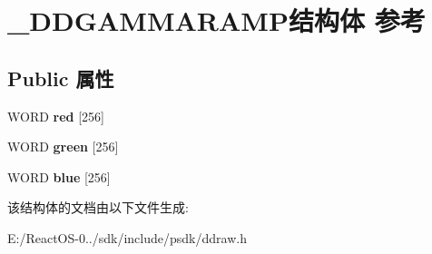\hypertarget{struct___d_d_g_a_m_m_a_r_a_m_p}{}\section{\+\_\+\+D\+D\+G\+A\+M\+M\+A\+R\+A\+M\+P结构体 参考}
\label{struct___d_d_g_a_m_m_a_r_a_m_p}
\subsection*{Public 属性}
\begin{DoxyCompactItemize}
\item 
\mbox{\label{struct___d_d_g_a_m_m_a_r_a_m_p_a33bc12ad9bbd9c04430d00385ddef9e5}} 
W\+O\+RD {\bfseries red} \mbox{[}256\mbox{]}
\item 
\mbox{\label{struct___d_d_g_a_m_m_a_r_a_m_p_aad34f80b8d805c0ff66f31fb583fd3dc}} 
W\+O\+RD {\bfseries green} \mbox{[}256\mbox{]}
\item 
\mbox{\label{struct___d_d_g_a_m_m_a_r_a_m_p_a21138751e450d0e5cb2350a722a82ca1}} 
W\+O\+RD {\bfseries blue} \mbox{[}256\mbox{]}
\end{DoxyCompactItemize}


该结构体的文档由以下文件生成\+:\begin{DoxyCompactItemize}
\item 
E\+:/\+React\+O\+S-\/0../sdk/include/psdk/ddraw.\+h\end{DoxyCompactItemize}
